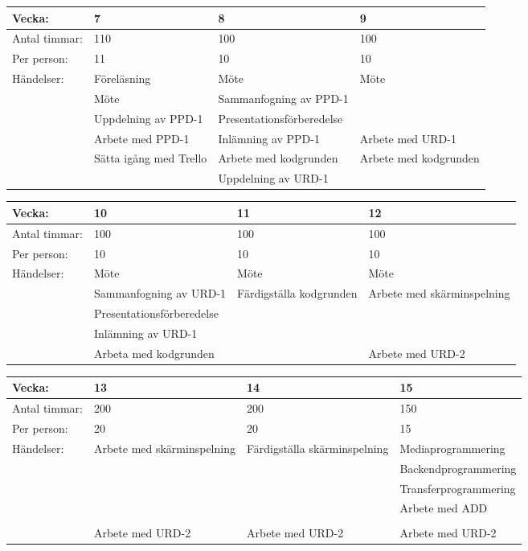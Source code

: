 \begin{tabular}{ | p{65pt} || p{110pt} | p{110pt} | p{110pt} |}
  \hline
  Vecka: & 7 & 8 & 9  \\ \hline
  Antal timmar: & 110 & 100 & 100\\ \hline
  Per person: & 11 & 10 & 10\\ \hline
  Händelser: & Föreläsning & Möte & Möte\\ \hline
  & Möte & Sammanfogning av PPD-1 &\\ \hline
  & Uppdelning av PPD-1 & Presentationsförberedelse &  \\ \hline
  & Arbete med PPD-1 & Inlämning av PPD-1 & Arbete med URD-1 \\ \hline
  & Sätta igång med Trello & Arbete med kodgrunden & Arbete med kodgrunden \\ \hline
& & Uppdelning av URD-1 & \\ \hline
\end{tabular}

\begin{tabular}{ | p{65pt} || p{110pt} | p{110pt} | p{110pt} |}
  \hline
  Vecka: & 10 & 11 & 12  \\ \hline
  Antal timmar: & 100 & 100 & 100 \\ \hline
  Per person: & 10 & 10 & 10 \\ \hline
  Händelser: & Möte & Möte & Möte\\ \hline
  & Sammanfogning av URD-1 & Färdigställa kodgrunden & Arbete med skärminspelning\\ \hline
  & Presentationsförberedelse &  &  \\ \hline
  & Inlämning av URD-1 &  &  \\ \hline
  & Arbeta med kodgrunden &  & Arbete med URD-2 \\ \hline
\end{tabular}

\begin{tabular}{ | p{65pt} || p{110pt} | p{110pt} | p{110pt} |}
  \hline
  Vecka: & 13 & 14 & 15  \\ \hline
  Antal timmar: & 200 & 200 & 150 \\ \hline
  Per person: & 20 & 20 & 15 \\ \hline
  Händelser: & Arbete med skärminspelning & Färdigställa skärminspelning & Mediaprogrammering \\ \hline
  &  &  & Backendprogrammering \\ \hline
  &  &  & Transferprogrammering \\ \hline
  &  &  & Arbete med ADD \\ \hline
  &  &  &  \\ \hline
  & Arbete med URD-2 & Arbete med URD-2 & Arbete med URD-2\\ \hline
\end{tabular}

